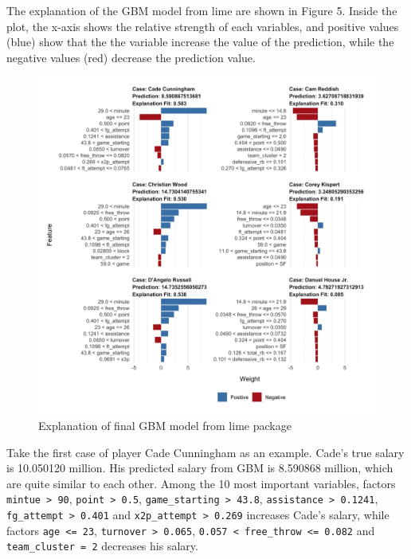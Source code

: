 \documentclass[
]{article}
\begin{document}
The explanation of the GBM model from lime are shown in Figure 5. Inside
the plot, the x-axis shows the relative strength of each variables, and
positive values (blue) show that the the variable increase the value of
the prediction, while the negative values (red) decrease the prediction
value.

\begin{figure}
\centering
\includegraphics[width=\textwidth,height=0.5\textheight]{report_figures/figure_tree_4.png}
\caption{Explanation of final GBM model from lime package}
\end{figure}

Take the first case of player Cade Cunningham as an example. Cade's true
salary is 10.050120 million. His predicted salary from GBM is 8.590868
million, which are quite similar to each other. Among the 10 most
important variables, factors \texttt{mintue\ \textgreater{}\ 90},
\texttt{point\ \textgreater{}\ 0.5},
\texttt{game\_starting\ \textgreater{}\ 43.8},
\texttt{assistance\ \textgreater{}\ 0.1241},
\texttt{fg\_attempt\ \textgreater{}\ 0.401} and
\texttt{x2p\_attempt\ \textgreater{}\ 0.269} increases Cade's salary,
while factors \texttt{age\ \textless{}=\ 23},
\texttt{turnover\ \textgreater{}\ 0.065},
\texttt{0.057\ \textless{}\ free\_throw\ \textless{}=\ 0.082} and
\texttt{team\_cluster\ =\ 2} decreases his salary.
\end{document}
